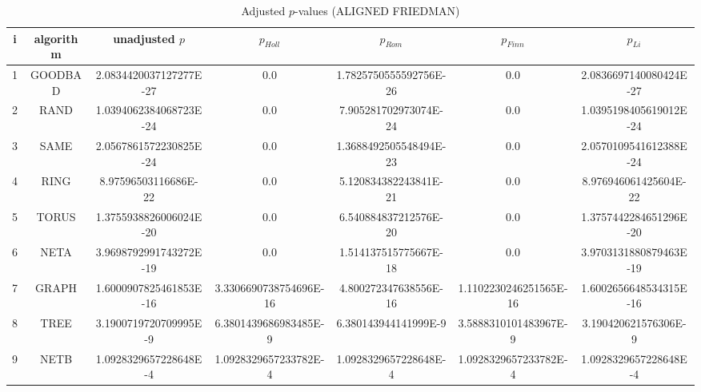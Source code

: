 \documentclass[a4paper,10pt]{article}
\begin{document}
\begin{landscape}
\begin{table}[!htp]
\centering\scriptsize
\caption{Adjusted $p$-values (ALIGNED FRIEDMAN)}
\begin{tabular}{ccccccc}
i&algorithm&unadjusted $p$&$p_{Holl}$&$p_{Rom}$&$p_{Finn}$&$p_{Li}$\\
\hline
1& GOODBAD&2.0834420037127277E-27&0.0&1.7825750555592756E-26&0.0&2.0836697140080424E-27\\
2& RAND&1.0394062384068723E-24&0.0&7.905281702973074E-24&0.0&1.0395198405619012E-24\\
3& SAME&2.0567861572230825E-24&0.0&1.3688492505548494E-23&0.0&2.0570109541612388E-24\\
4& RING&8.97596503116686E-22&0.0&5.120834382243841E-21&0.0&8.976946061425604E-22\\
5& TORUS&1.3755938826006024E-20&0.0&6.540884837212576E-20&0.0&1.3757442284651296E-20\\
6& NETA&3.9698792991743272E-19&0.0&1.514137515775667E-18&0.0&3.9703131880879463E-19\\
7& GRAPH&1.6000907825461853E-16&3.3306690738754696E-16&4.800272347638556E-16&1.1102230246251565E-16&1.6002656648534315E-16\\
8& TREE&3.1900719720709995E-9&6.3801439686983485E-9&6.380143944141999E-9&3.5888310101483967E-9&3.190420621576306E-9\\
9& NETB&1.0928329657228648E-4&1.0928329657233782E-4&1.0928329657228648E-4&1.0928329657233782E-4&1.0928329657228648E-4\\
\hline
\end{tabular}
\end{table}


\newpage


\end{landscape}
\end{document}

